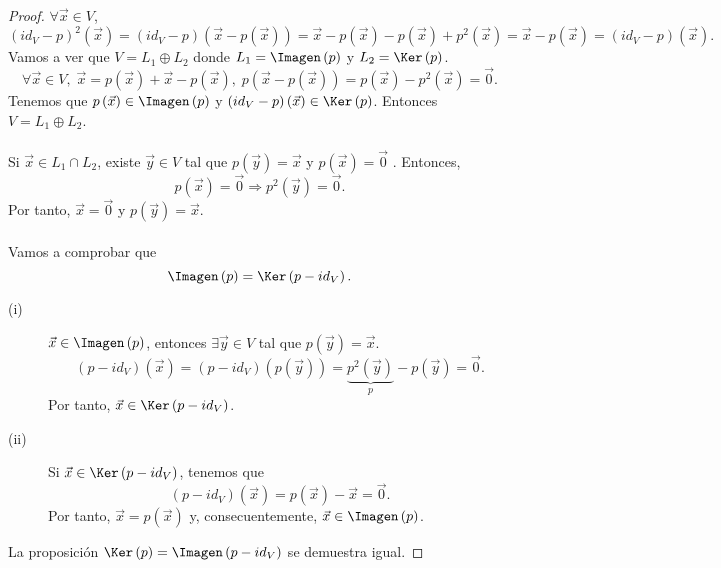 \begin{proof}
$\displaystyle \forall \vec{x} \in V $,
\[ \left(id _{V} - p\right)^{2}\left(\vec{x}\right) = \left(id _{V} - p\right)\left(\vec{x}-p\left(\vec{x}\right)\right) = \vec{x}-p\left(\vec{x}\right)-p\left(\vec{x}\right) + p^{2}\left(\vec{x}\right) = \vec{x}-p\left(\vec{x}\right) = \left(id _{V}- p\right)\left(\vec{x}\right).\]
Vamos a ver que $\displaystyle V = L_{1} \oplus L_{2} $ donde $\displaystyle L_{1} = \Imagen\left(p\right) $ y $\displaystyle L_{2} = \Ker\left(p\right) $.
\[\forall \vec{x} \in V, \; \vec{x} = p\left(\vec{x}\right) + \vec{x}-p\left(\vec{x}\right), \; p\left(\vec{x}-p\left(\vec{x}\right)\right) = p\left(\vec{x}\right) - p^{2}\left(\vec{x}\right) = \vec{0} .\]
Tenemos que $\displaystyle p\left(\vec{x}\right) \in \Imagen\left(p\right) $ y $\displaystyle \left(id _{V}-p\right)\left(\vec{x}\right) \in \Ker\left(p\right) $.
Entonces $\displaystyle V = L_{1}\oplus L_{2} $. \\ \\
Si $\displaystyle \vec{x} \in L_{1}\cap L_{2} $, existe $\displaystyle \vec{y} \in V $ tal que $\displaystyle p\left(\vec{y}\right) = \vec{x} $ y $\displaystyle p\left(\vec{x}\right) = \vec{0} $ . Entonces, 
\[p\left(\vec{x}\right) = \vec{0} \Rightarrow p^{2}\left(\vec{y}\right) = \vec{0} .\]
Por tanto, $\displaystyle \vec{x} = \vec{0} $ y $\displaystyle p\left(\vec{y}\right)= \vec{x} $.\\ \\
Vamos a comprobar que 
\[\Imagen\left(p\right) = \Ker\left(p-id _{V}\right) .\]
\begin{description}
\item[(i)] $\displaystyle \vec{x} \in \Imagen\left(p\right) $, entonces $\displaystyle \exists \vec{y} \in V $ tal que $\displaystyle p\left(\vec{y}\right) = \vec{x} $. 
	\[\left(p-id _{V}\right)\left(\vec{x}\right) = \left(p- id _{V}\right)\left(p\left(\vec{y}\right)\right) = \underbrace{p^{2} \left(\vec{y}\right)}_{p} -p\left(\vec{y}\right) = \vec{0} .\]
	Por tanto, $\displaystyle \vec{x} \in \Ker\left(p-id _{V}\right) $.
\item[(ii)] Si $\displaystyle \vec{x} \in \Ker\left(p- id _{V}\right) $, tenemos que
	\[\left(p- id _{V}\right)\left(\vec{x}\right) = p\left(\vec{x}\right)- \vec{x} = \vec{0} .\]
	Por tanto, $\displaystyle \vec{x} = p\left(\vec{x}\right) $ y, consecuentemente, $\displaystyle \vec{x} \in \Imagen\left(p\right) $.
\end{description}
La proposición $\displaystyle \Ker\left(p\right) = \Imagen\left(p- id _{V}\right) $ se demuestra igual.
\end{proof}

